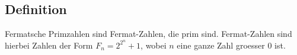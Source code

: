 \subsection{Definition}
Fermatsche Primzahlen sind Fermat-Zahlen, die prim sind. Fermat-Zahlen sind hierbei Zahlen der Form $F_n = 2^2^n + 1$, wobei $n$ eine ganze Zahl groesser $0$ ist.
